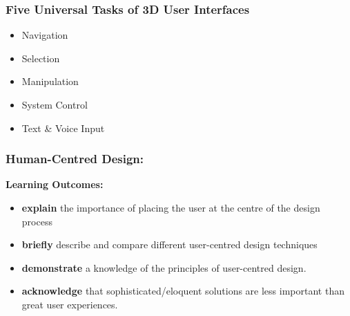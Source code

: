 {
      \begin{frame}[plain]
     \end{frame}
}

\begin{frame}
	\frametitle{Five Universal Tasks of 3D User Interfaces }
	\begin{itemize}
		\item Navigation
		\item Selection
		\item Manipulation
		\item System Control 
		\item Text \& Voice Input
	\end{itemize}
\end{frame}

\begin{frame}
	\frametitle{Human-Centred Design:}
	
	\textbf{Learning Outcomes:}
	
	\begin{itemize}
		\item \textbf{explain} the importance of placing the user at the centre of the design process
		\item \textbf{briefly} describe and compare different user-centred design techniques
		\item \textbf{demonstrate} a knowledge of the principles of user-centred design.	
		\item \textbf{acknowledge} that sophisticated/eloquent solutions are less important than great user experiences. 
	\end{itemize}
\end{frame}



